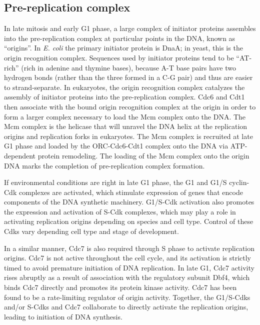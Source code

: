 \hypertarget{pre-replication-complex}{%
\subsection{Pre-replication complex}\label{pre-replication-complex}}

In late mitosis and early G1 phase, a large complex of initiator proteins assembles into the pre-replication complex at particular points in the DNA, known as ``origins''. In \emph{E. coli} the primary initiator protein is DnaA; in yeast, this is the origin recognition complex. Sequences used by initiator proteins tend to be ``AT-rich'' (rich in adenine and thymine bases), because A-T base pairs have two hydrogen bonds (rather than the three formed in a C-G pair) and thus are easier to strand-separate. In eukaryotes, the origin recognition complex catalyzes the assembly of initiator proteins into the pre-replication complex. Cdc6 and Cdt1 then associate with the bound origin recognition complex at the origin in order to form a larger complex necessary to load the Mcm complex onto the DNA. The Mcm complex is the helicase that will unravel the DNA helix at the replication origins and replication forks in eukaryotes. The Mcm complex is recruited at late G1 phase and loaded by the ORC-Cdc6-Cdt1 complex onto the DNA via ATP-dependent protein remodeling. The loading of the Mcm complex onto the origin DNA marks the completion of pre-replication complex formation.

If environmental conditions are right in late G1 phase, the G1 and G1/S cyclin-Cdk complexes are activated, which stimulate expression of genes that encode components of the DNA synthetic machinery. G1/S-Cdk activation also promotes the expression and activation of S-Cdk complexes, which may play a role in activating replication origins depending on species and cell type. Control of these Cdks vary depending cell type and stage of development.

In a similar manner, Cdc7 is also required through S phase to activate replication origins. Cdc7 is not active throughout the cell cycle, and its activation is strictly timed to avoid premature initiation of DNA replication. In late G1, Cdc7 activity rises abruptly as a result of association with the regulatory subunit Dbf4, which binds Cdc7 directly and promotes its protein kinase activity. Cdc7 has been found to be a rate-limiting regulator of origin activity. Together, the G1/S-Cdks and/or S-Cdks and Cdc7 collaborate to directly activate the replication origins, leading to initiation of DNA synthesis.

